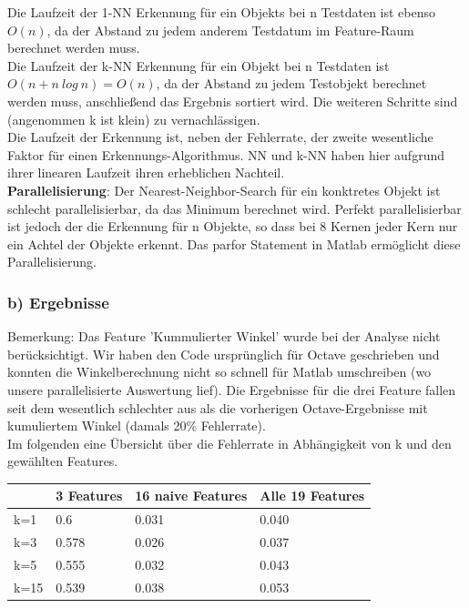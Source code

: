 \documentclass{article}
\begin{document}
				Die Laufzeit der 1-NN Erkennung für ein Objekts bei n Testdaten ist ebenso $ O(n) $, da der Abstand zu jedem anderem Testdatum im Feature-Raum berechnet werden muss.\\
				
				Die Laufzeit der k-NN Erkennung für ein Objekt bei n Testdaten ist $ O(n + n\ log\ n) = O(n) $, da der Abstand zu jedem Testobjekt berechnet werden muss, anschließend das Ergebnis sortiert wird. Die weiteren Schritte sind (angenommen k ist klein) zu vernachlässigen.\\
				
				Die Laufzeit der Erkennung ist, neben der Fehlerrate, der zweite wesentliche Faktor für einen Erkennungs-Algorithmus. NN und k-NN haben hier aufgrund ihrer linearen Laufzeit ihren erheblichen Nachteil.\\
				
				\textbf{Parallelisierung}: Der Nearest-Neighbor-Search für ein konktretes Objekt ist schlecht parallelisierbar, da das Minimum berechnet wird. Perfekt parallelisierbar ist jedoch der die Erkennung für n Objekte, so dass bei 8 Kernen jeder Kern nur ein Achtel der Objekte erkennt. Das parfor Statement in Matlab ermöglicht diese Parallelisierung.
				
			
			\subsubsection*{b) Ergebnisse}
				Bemerkung: Das Feature 'Kummulierter Winkel' wurde bei der Analyse nicht berücksichtigt. Wir haben den Code ursprünglich für Octave geschrieben und konnten die Winkelberechnung nicht so schnell für Matlab umschreiben (wo unsere parallelisierte Auswertung lief). Die Ergebnisse für die drei Feature fallen seit dem wesentlich schlechter aus als die vorherigen Octave-Ergebnisse mit kumuliertem Winkel (damals 20\% Fehlerrate).\\
				
				Im folgenden eine Übersicht über die Fehlerrate in Abhängigkeit von k und den gewählten Features.
				\begin{table}[h!]
				    \begin{tabular}{|l|l|l|l|}
				        \hline
     					   ~  & 3 Features    & 16 naive Features   & Alle 19 Features \\ \hline
					        k=1  & 0.6   & 0.031 & 0.040 \\ 
					        k=3  & 0.578 & 0.026 & 0.037 \\ 
					        k=5  & 0.555 & 0.032 & 0.043 \\ 
					        k=15 & 0.539 & 0.038 & 0.053 \\
				        \hline
				    \end{tabular}
				\end{table}
				
\end{document}
